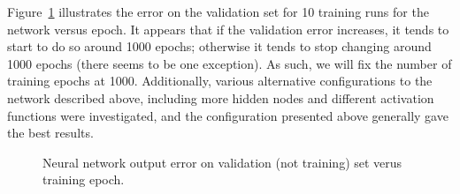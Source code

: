  
Figure~\ref{fig:epochs} illustrates the error on the validation set for 10
training runs for the network versus epoch. It appears that if the validation
error increases, it tends to start to do so around 1000 epochs; otherwise it
tends to stop changing around 1000 epochs (there seems to be one exception). As
such, we will fix the number of training epochs at 1000.  Additionally, various
alternative configurations to the network described above, including more hidden
nodes and different activation functions were investigated, and the
configuration presented above generally gave the best results. 

\begin{figure}
\centering

\vspace*{-5pt}
\caption{Neural network output error on validation (not training) set verus
training epoch.}
\label{fig:epochs}
\end{figure}

